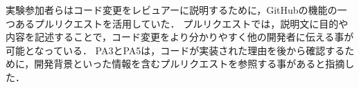 実験参加者らはコード変更をレビュアーに説明するために，GitHubの機能の一つあるプルリクエストを活用していた．
プルリクエストでは，説明文に目的や内容を記述することで，コード変更をより分かりやすく他の開発者に伝える事が可能となっている．
PA3とPA5は，コードが実装された理由を後から確認するために，開発背景といった情報を含むプルリクエストを参照する事があると指摘した．









